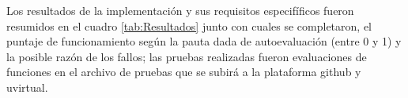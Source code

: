 Los resultados de la implementación y sus requisitos especifíficos fueron resumidos 
en el cuadro \ref{tab:Resultados} junto con cuales se completaron, el puntaje de 
funcionamiento según la pauta dada de autoevaluación (entre 0 y 1) y la posible razón de los fallos; las pruebas 
realizadas fueron evaluaciones de funciones en el archivo de pruebas que se subirá 
a la plataforma github y uvirtual.